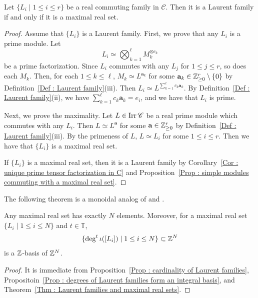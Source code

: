 \begin{Thm}
\label{Thm : Laurent families and maximal real sets}
Let $\{L_i \mid 1 \leq i \leq r\}$
be a real commuting family in $\mathscr{C}$.
Then it is a Laurent family if and only if it is a maximal real set.
\end{Thm}

\begin{proof}
Assume that $\{L_i\}$ is a Laurent family.
First, we prove that any $L_i$ is a prime module.
Let
\[
L_i \simeq \bigotimes_{k=1}^{\ell}M_k^{\otimes c_k}
\]
be a prime factorization.
Since $L_i$ commutes with any $L_j$ for $1 \leq j \leq r$,
so does each $M_k$.
Then, for each $1 \leq k \leq \ell$,
$M_k \simeq L^{\mathbf{a}_k}$
for some $\mathbf{a}_k \in \mathbb{Z}_{\geq 0}^r \setminus \{0\}$
by Definition~\ref{Def : Laurent family}(iii).
Then $L_i \simeq L^{\sum_{k=1}^{\ell}c_k\mathbf{a}_k}$.
By Definition~\ref{Def : Laurent family}(ii),
we have $\sum_{k=1}^{\ell}c_k\mathbf{a}_k = e_i$,
and we have that $L_i$ is prime.

Next, we prove the maximality.
Let $L \in \mathop{\mathrm{Irr}}\nolimits\mathscr{C}$ be a real prime module
which commutes with any $L_i$.
Then $L \simeq L^{\mathbf{a}}$
for some $\mathbf{a} \in \mathbb{Z}_{\geq 0}^r$
by Definition~\ref{Def : Laurent family}(iii).
By the primeness of $L$, $L \simeq L_i$
for some $1 \leq i \leq r$.
Then we have that $\{L_i\}$ is a maximal real set.

If $\{L_i\}$ is a maximal real set, then it is a Laurent family
by Corollary~\ref{Cor : unique prime tensor factorization in C}
and Proposition~\ref{Prop : simple modules commuting with a maximal real set}.
\end{proof}

The following theorem is a monoidal analog of
\cite[Theorem 3.3]{BMRRT} and \cite[Theorem 2.4]{DK08}.

\begin{Thm}
\label{Thm : cardinality of maximal real sets}
Any maximal real set has exactly $N$ elements. 
Moreover, for a maximal real set $\{L_i \mid 1 \leq i \leq N\}$ and $t \in \mathbb{T}$, 
\[
\{\deg^t\iota([L_i]) \mid 1 \leq i \leq N\} \subset \mathbb{Z}^N
\]
is a $\mathbb{Z}$-basis of $\mathbb{Z}^N$.

\end{Thm}

\begin{proof}
It is immediate from Proposition~\ref{Prop : cardinality of Laurent families}, 
Propositoin~\ref{Prop : degrees of Laurent families form an integral basis}, 
and Theorem~\ref{Thm : Laurent families and maximal real sets}. 
\end{proof}

